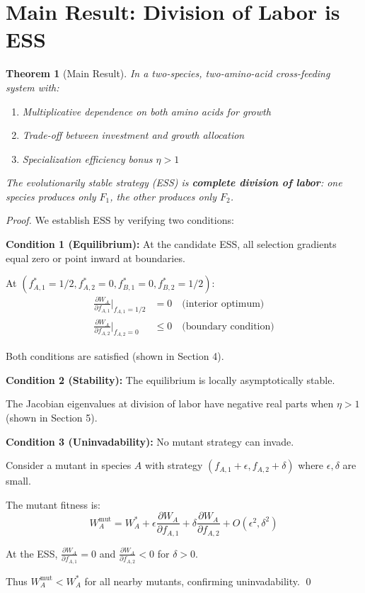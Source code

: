 \documentclass[11pt]{article}
\newtheorem{theorem}{Theorem}
\theoremstyle{definition}
\theoremstyle{remark}
\newcommand{\pd}[2]{\frac{\partial #1}{\partial #2}}
\begin{document}
\section{Main Result: Division of Labor is ESS}

\begin{theorem}[Main Result]
\label{thm:main}
In a two-species, two-amino-acid cross-feeding system with:
\begin{enumerate}
    \item Multiplicative dependence on both amino acids for growth
    \item Trade-off between investment and growth allocation
    \item Specialization efficiency bonus $\eta > 1$
\end{enumerate}

The evolutionarily stable strategy (ESS) is \textbf{complete division of labor}: one species produces only $F_1$, the other produces only $F_2$.
\end{theorem}

\begin{proof}
We establish ESS by verifying two conditions:

\textbf{Condition 1 (Equilibrium):} At the candidate ESS, all selection gradients equal zero or point inward at boundaries.

At $(f_{A,1}^* = 1/2, f_{A,2}^* = 0, f_{B,1}^* = 0, f_{B,2}^* = 1/2)$:
\begin{align}
\pd{W_A}{f_{A,1}}\bigg|_{f_{A,1}=1/2} &= 0 \quad \text{(interior optimum)}\\
\pd{W_A}{f_{A,2}}\bigg|_{f_{A,2}=0} &\leq 0 \quad \text{(boundary condition)}
\end{align}

Both conditions are satisfied (shown in Section 4).

\textbf{Condition 2 (Stability):} The equilibrium is locally asymptotically stable.

The Jacobian eigenvalues at division of labor have negative real parts when $\eta > 1$ (shown in Section 5).

\textbf{Condition 3 (Uninvadability):} No mutant strategy can invade.

Consider a mutant in species $A$ with strategy $(f_{A,1} + \epsilon, f_{A,2} + \delta)$ where $\epsilon, \delta$ are small.

The mutant fitness is:
\begin{equation}
W_A^{\text{mut}} = W_A^* + \epsilon \pd{W_A}{f_{A,1}} + \delta \pd{W_A}{f_{A,2}} + O(\epsilon^2, \delta^2)
\end{equation}

At the ESS, $\pd{W_A}{f_{A,1}} = 0$ and $\pd{W_A}{f_{A,2}} < 0$ for $\delta > 0$.

Thus $W_A^{\text{mut}} < W_A^*$ for all nearby mutants, confirming uninvadability. \qed
\end{proof}
\end{document}
